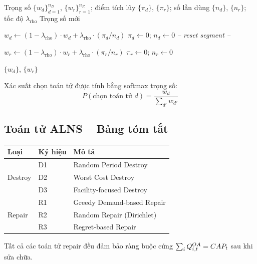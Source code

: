 \begin{algorithm}[H]
\caption{Cập nhật trọng số thích nghi ALNS}
\label{alg:weight_update}
\begin{algorithmic}[1]
\Require Trọng số $\{w_d\}_{d=1}^{n_D}$, $\{w_r\}_{r=1}^{n_R}$; điểm tích lũy $\{\pi_d\}$, $\{\pi_r\}$; số lần dùng $\{n_d\}$, $\{n_r\}$; tốc độ $\lambda_{\text{rho}}$
\Ensure Trọng số mới

    \State $w_d \gets (1-\lambda_{\text{rho}}) \cdot w_d + \lambda_{\text{rho}} \cdot (\pi_d / n_d)$
  \EndIf
  \State $\pi_d \gets 0$; \; $n_d \gets 0$ \quad \textit{-- reset segment --}
\EndFor

    \State $w_r \gets (1-\lambda_{\text{rho}}) \cdot w_r + \lambda_{\text{rho}} \cdot (\pi_r / n_r)$
  \EndIf
  \State $\pi_r \gets 0$; \; $n_r \gets 0$
\EndFor

\State \Return $\{w_d\}$, $\{w_r\}$

\end{algorithmic}
\end{algorithm}

\noindent Xác suất chọn toán tử được tính bằng softmax trọng số:
\begin{equation}
  P(\text{chọn toán tử } d) = \frac{w_d}{\sum_{d'} w_{d'}}
\end{equation}

\subsection{Toán tử ALNS -- Bảng tóm tắt}

\begin{center}
\begin{tabular}{lll}
\toprule
\textbf{Loại} & \textbf{Ký hiệu} & \textbf{Mô tả} \\
\midrule
\multirow{3}{*}{Destroy} & D1 & Random Period Destroy \\
                          & D2 & Worst Cost Destroy \\
                          & D3 & Facility-focused Destroy \\
\midrule
\multirow{3}{*}{Repair}  & R1 & Greedy Demand-based Repair \\
                          & R2 & Random Repair (Dirichlet) \\
                          & R3 & Regret-based Repair \\
\bottomrule
\end{tabular}
\end{center}

\noindent Tất cả các toán tử repair đều đảm bảo ràng buộc cứng $\sum_i Q^{OA}_{i,t} = CAP_t$ sau khi sửa chữa.
